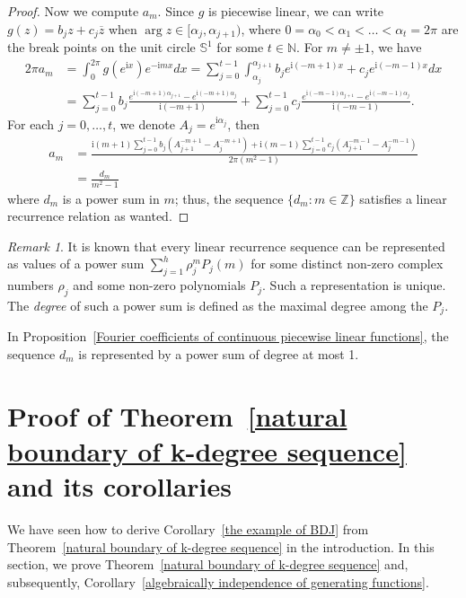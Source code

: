 \documentclass[11pt,a4paper]{article}
\theoremstyle{plain}
\theoremstyle{remark}
\newtheorem{remark}[theorem]{Remark}
\theoremstyle{custombold}
\newcommand{\irm}{\mathrm{i}}
\begin{document}
\begin{proof}
Now we compute $a_m$. Since $g$ is piecewise linear, we can write 
$g(z)=b_jz+c_j\overline{z}$ when $\arg z\in[\alpha_j,\alpha_{j+1})$, where $0=\alpha_0<\alpha_1<\ldots<\alpha_{t}=2\pi$ are the break points on the unit circle $\mathbb S^1$ for some $t\in\mathbb N$. For $m\neq\pm1$, we have
\begin{align*}
  2\pi a_{m}&=\int_{0}^{2\pi}g(e^{\irm x})e^{-\irm m x}dx=\sum_{j=0}^{t-1}\int_{\alpha_j}^{\alpha_{j+1}}b_je^{\irm  (-m+1)x}+c_je^{\irm  (-m-1)x}dx\\&=\sum_{j=0}^{t-1}b_j\frac{e^{\irm (-m+1)\alpha_{j+1}}-e^{\irm (-m+1)\alpha_{j}}}{\irm(-m+1)}+\sum_{j=0}^{t-1}c_j\frac{e^{\irm (-m-1)\alpha_{j+1}}-e^{\irm (-m-1)\alpha_{j}}}{\irm(-m-1)}.
\end{align*}
For each $j=0,\ldots,t$, we denote $A_j=e^{\irm \alpha_j}$, then\begin{align*}
    a_{m}&=\frac{\irm(m+1)\sum_{j=0}^{t-1}b_j(A_{j+1}^{-m+1}-A_j^{-m+1})+\irm(m-1)\sum_{j=0}^{t-1}c_j(A_{j+1}^{-m-1}-A_j^{-m-1})}{2\pi(m^2-1)}\\
    &=\frac{d_m}{m^2-1}
\end{align*}
where $d_m$ is a power sum in $m$; thus, the sequence $\{d_m:m\in\mathbb Z\}$ satisfies a linear recurrence relation as wanted.
\end{proof}
\begin{remark}\label{degree of a power sum}
	It is known that every linear recurrence sequence can be represented as values of a power sum $\sum_{j=1}^h\rho_j^m P_j(m)$ for some distinct non-zero complex numbers $\rho_j$ and some non-zero polynomials $P_j$. Such a representation is unique. The \emph{degree} of such a power sum is defined as the maximal degree among the $P_j$.
	
	In Proposition~\ref{Fourier coefficients of continuous piecewise linear functions}, the sequence $d_m$ is represented by a power sum of degree at most 1.

\end{remark}




\section{Proof of Theorem~\ref{natural boundary of k-degree sequence} and its corollaries}\label{Section: natural boundary of generating series}
 

We have seen how to derive Corollary~\ref{the example of BDJ} from Theorem~\ref{natural boundary of k-degree sequence} in the introduction. In this section, we prove Theorem~\ref{natural boundary of k-degree sequence} and, subsequently,  Corollary~\ref{algebraically independence of generating functions}.
\end{document}
